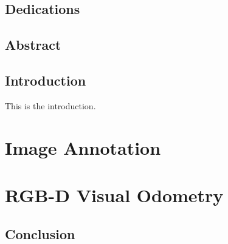\frontmatter

\makeflyleaf%

\pagestyle{fancy}
\fancyhf{}
\fancyhead[LE]{\leftmark}
\fancyhead[RO]{\rightmark}
\fancyhead[LO]{\today}
\fancyfoot[CE,CO]{\thepage}

\chapter*{Dedications}%
\label{cha:dedications}


\chapter*{Abstract}%
\label{cha:abstract}


\dominitoc%
\tableofcontents

\mainmatter%

\lstset{style=CodeStyle}

\chapter*{Introduction}%
\label{cha:introduction}


This is the introduction.

\part{Image Annotation}%
\label{prt:image_annotation}


\part{RGB-D Visual Odometry}%
\label{prt:rgb_d_vo}


\chapter*{Conclusion}%
\label{cha:conclusion}


\backmatter%



